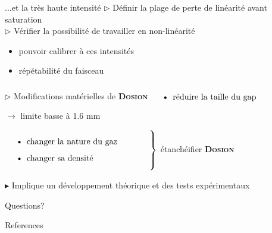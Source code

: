 \documentclass[10pt]{beamer}
\newcommand{\dosion}{\textbf{\textsc{Dosion}}\xspace}
\begin{document}
\begin{frame}[fragile]{...et la très haute intensité}
$\rhd$ Définir la plage de perte de linéarité avant saturation\\
$\rhd$ Vérifier la possibilité de travailler en non-linéarité
\begin{itemize}
\item pouvoir calibrer à ces intensités
\item répétabilité du faisceau
\end{itemize}
\vspace{2ex}
$\rhd$ Modifications matérielles de \dosion
$\left. \text{\parbox{0.48\linewidth}{
\begin{itemize}
\item réduire la taille du gap
\end{itemize}
}} \right.$ $\rightarrow$ limite basse à \alert{1.6 mm}

$\left. \text{\parbox{0.5\linewidth}{
\begin{itemize}
\item changer la nature du gaz
\item changer sa densité
\end{itemize}
}} \right \}$ \alert{étanchéifier} \dosion

$\blacktriangleright$ Implique un développement théorique et des \alert{tests expérimentaux} 
\end{frame}

{
\begin{frame}[standout]
  Questions?
\end{frame}
}

\appendix

\begin{frame}[allowframebreaks]{References}

  
  

\end{frame}
\end{document}
